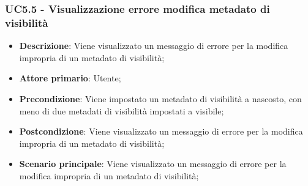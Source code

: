 \subsubsection{UC5.5 - Visualizzazione errore modifica metadato di visibilità}
\label{ssub:uc5.5}

\begin{itemize}
    \item \textbf{Descrizione}: Viene visualizzato un messaggio di errore per la modifica impropria di un metadato di visibilità;

    \item \textbf{Attore primario}: Utente;
    
    \item \textbf{Precondizione}:   Viene impostato un metadato di visibilità a nascosto, con meno di due metadati di 
    visibilità impostati a visibile;

    \item \textbf{Postcondizione}:   Viene visualizzato un messaggio di errore per la modifica impropria di un metadato 
    di visibilità;
    
    \item \textbf{Scenario principale}: Viene visualizzato un messaggio di errore per la modifica impropria di un 
    metadato di visibilità;
\end{itemize}